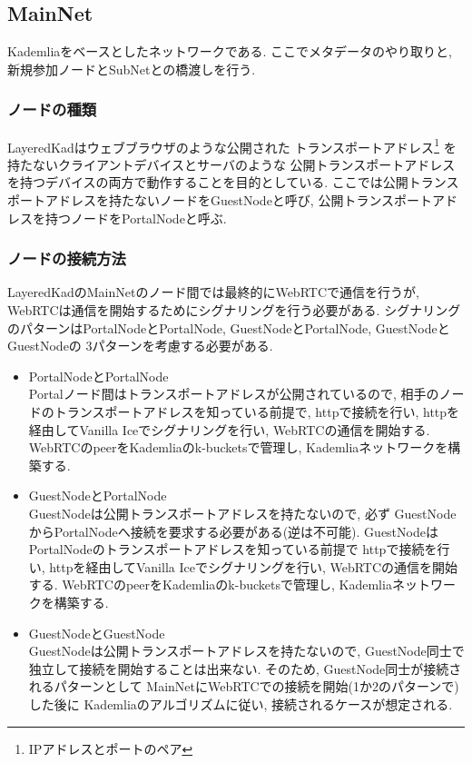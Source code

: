 \documentclass[sotsuron]{jcsie}
\begin{document}
\subsection{MainNet}
Kademliaをベースとしたネットワークである.
ここでメタデータのやり取りと, 新規参加ノードとSubNetとの橋渡しを行う.

\subsubsection{ノードの種類}
LayeredKadはウェブブラウザのような公開された
トランスポートアドレス\footnote{IPアドレスとポートのペア}
を持たないクライアントデバイスとサーバのような
公開トランスポートアドレスを持つデバイスの両方で動作することを目的としている.
ここでは公開トランスポートアドレスを持たないノードをGuestNodeと呼び, 
公開トランスポートアドレスを持つノードをPortalNodeと呼ぶ.

\subsubsection{ノードの接続方法}
LayeredKadのMainNetのノード間では最終的にWebRTCで通信を行うが, 
WebRTCは通信を開始するためにシグナリングを行う必要がある.
シグナリングのパターンはPortalNodeとPortalNode, 
GuestNodeとPortalNode, GuestNodeとGuestNodeの
3パターンを考慮する必要がある.

\begin{itemize}
	\item {PortalNodeとPortalNode}\\
	      Portalノード間はトランスポートアドレスが公開されているので, 
	      相手のノードのトランスポートアドレスを知っている前提で, 
	      httpで接続を行い, httpを経由してVanilla Iceでシグナリングを行い, 
	      WebRTCの通信を開始する.
	      WebRTCのpeerをKademliaのk-bucketsで管理し, 
	      Kademliaネットワークを構築する.
	      \\
	\item {GuestNodeとPortalNode}\\
	      GuestNodeは公開トランスポートアドレスを持たないので, 必ず
	      GuestNodeからPortalNodeへ接続を要求する必要がある(逆は不可能).
	      GuestNodeはPortalNodeのトランスポートアドレスを知っている前提で
	      httpで接続を行い, httpを経由してVanilla Iceでシグナリングを行い, 
	      WebRTCの通信を開始する.
	      WebRTCのpeerをKademliaのk-bucketsで管理し, 
	      Kademliaネットワークを構築する.
	      \\
	\item {GuestNodeとGuestNode}\\
	      GuestNodeは公開トランスポートアドレスを持たないので, 
	      GuestNode同士で独立して接続を開始することは出来ない.
	      そのため, GuestNode同士が接続されるパターンとして
	      MainNetにWebRTCでの接続を開始(1か2のパターンで)した後に
	      Kademliaのアルゴリズムに従い, 接続されるケースが想定される.
\end{itemize}
\end{document}
